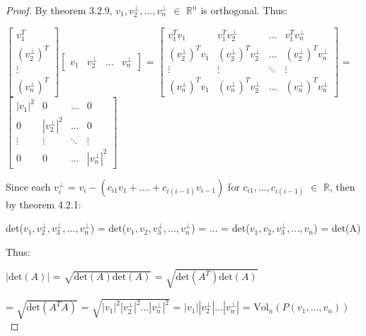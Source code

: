     \begin{proof}
        By {\color{red} theorem 3.2.9},
        $v_1,v_2^{\perp},...,v_n^{\perp}$ $\in$ $\mathbb{R}^n$
        is orthogonal. Thus:

        \hspace{0.5cm}
        \footnotesize
        $\begin{bmatrix}
            v_1^T \\
            (v_2^{\perp})^T \\
            \vdots \\
            (v_n^{\perp})^T
        \end{bmatrix}
        \begin{bmatrix}
            v_1 & v_2^{\perp} & \hdots & v_n^{\perp}
        \end{bmatrix}$ =
        $\begin{bmatrix}
            v_1^Tv_1 & v_1^Tv_2^{\perp} & \hdots & v_1^Tv_n^{\perp} \\
            (v_2^{\perp})^Tv_1 & (v_2^{\perp})^Tv_2^{\perp}
                & \hdots & (v_2^{\perp})^Tv_n^{\perp} \\
            \vdots & \vdots & \ddots & \vdots \\
            (v_n^{\perp})^Tv_1 & (v_n^{\perp})^Tv_2^{\perp}
                & \hdots & (v_n^{\perp})^Tv_n^{\perp}
        \end{bmatrix}$ =
        $\begin{bmatrix}
            |v_1|^2 & 0 & \hdots & 0 \\
            0 & |v_2^{\perp}|^2 & \hdots & 0 \\
            \vdots & \vdots & \ddots & \vdots \\
            0 & 0 & \hdots & |v_n^{\perp}|^2
        \end{bmatrix}$
        \normalsize

        Since each $v_i^{\perp}$ = $v_i - (c_{i1}v_1 + .... + c_{i(i-1)}v_{i-1})$
        for $c_{i1},...,c_{i(i-1)}$ $\in$ $\mathbb{R}$, then
        by {\color{red} theorem 4.2.1}:

        \hspace{0.5cm}
        det($v_1,v_2^{\perp},v_3^{\perp},...,v_n^{\perp}$)
        = det($v_1,v_2,v_3^{\perp},...,v_n^{\perp}$)
        = ...
        = det($v_1,v_2,v_3^{\perp},...,v_n$)
        = det(A)

        Thus:

        \hspace{0.5cm}
        $|\text{det}(A)|$
        = $\sqrt{\text{det}(A)\text{det}(A)}$
        = $\sqrt{\text{det}(A^T)\text{det}(A)}$

        \hspace{2.1cm}
        = $\sqrt{\text{det}(A^TA)}$
        = $\sqrt{|v_1|^2 |v_2^{\perp}|^2 ... |v_n^{\perp}|^2}$
        = $|v_1| |v_2^{\perp}| ... |v_n^{\perp}|$
        = $\text{Vol}_n(P(v_1,...,v_n))$
    \end{proof}


